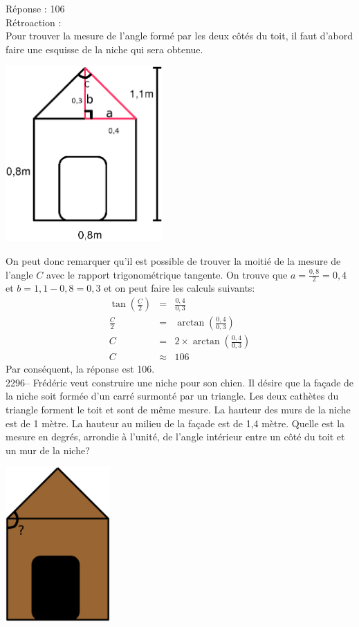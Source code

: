\documentclass[letterpaper, 12pt]{article}
\begin{document}
R\'eponse : 106\\

R\'etroaction :\\
Pour trouver la mesure de l'angle form\'e par les deux c\^ot\'es du toit, il faut d'abord faire une esquisse de la niche qui sera obtenue.\\
\begin{center}
 \includegraphics[width=6cm,bb=14 14 412 444]{Niche2295mesures.eps}
\end{center}
On peut donc remarquer qu'il est possible de trouver la moiti\'e de la mesure de l'angle $C$ avec le rapport trigonom\'etrique tangente. On trouve que $a=\frac{0,8}{2}=0,4$ et $b=1,1-0,8=0,3$ et on peut faire les calculs suivants:
\begin{eqnarray*}
\tan{\left( \frac{C}{2}\right) }&=&\frac{0,4}{0,3}\\[2mm]
\frac{C}{2}&=&\arctan{\left( \frac{0,4}{0,3}\right) }\\[2mm]
C&=&2\times\arctan{\left( \frac{0,4}{0,3}\right) }\\[2mm]
C&\approx&106
\end{eqnarray*}
Par cons\'equent, la r\'eponse est 106.\\

2296-- Fr\'ed\'eric veut construire une niche pour son chien. Il d\'esire que la fa\c cade de la niche soit form\'ee d'un carr\'e surmont\'e par un triangle. Les deux cath\`etes du triangle forment le toit et sont de m\^eme mesure. La hauteur des murs de la niche est de 1 m\`etre. La hauteur au milieu de la fa\c cade est de 1,4 m\`etre. Quelle est la mesure en degr\'es, arrondie \`a l'unit\'e, de l'angle int\'erieur entre un c\^ot\'e du toit et un mur de la niche?
\begin{center}
 \includegraphics[width=4cm,bb=14 14 627 807]{Niche2296.eps}
\end{center}
\end{document}
